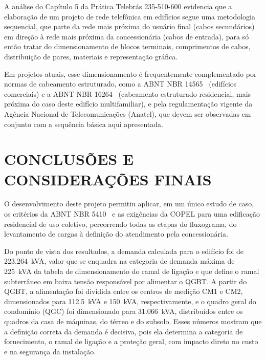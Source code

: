\documentclass[12pt,openright,oneside,a4paper,brazil]{abntex2}
\begin{document}
A análise do Capítulo 5 da Prática Telebrás 235-510-600 evidencia que a elaboração de um projeto de rede telefônica em edifícios segue uma metodologia sequencial, que parte da rede mais próxima do usuário final (cabos secundários) em direção à rede mais próxima da concessionária (cabos de entrada), para só então tratar do dimensionamento de blocos terminais, comprimentos de cabos, distribuição de pares, materiais e representação gráfica.

Em projetos atuais, esse dimensionamento é frequentemente complementado por normas de cabeamento estruturado, como a ABNT NBR 14565~\cite{nbr14565} (edifícios comerciais) e a ABNT NBR 16264~\cite{nbr16264} (cabeamento estruturado residencial, mais próxima do caso deste edifício multifamiliar), e pela regulamentação vigente da Agência Nacional de Telecomunicações (Anatel), que devem ser observadas em conjunto com a sequência básica aqui apresentada.

\chapter{CONCLUSÕES E CONSIDERAÇÕES FINAIS}

\hspace{1.27cm}O desenvolvimento deste projeto permitiu aplicar, em um único estudo de caso, os critérios da ABNT NBR 5410~\cite{nbr5410} e as exigências da COPEL para uma edificação residencial de uso coletivo, percorrendo todas as etapas do fluxograma, do levantamento de cargas à definição do atendimento pela concessionária.

Do ponto de vista dos resultados, a demanda calculada para o edifício foi de \SI{223,264}{kVA}, valor que se enquadra na categoria de demanda máxima de \SI{225}{kVA} da tabela de dimensionamento do ramal de ligação e que define o ramal subterrâneo em baixa tensão responsável por alimentar o QGBT. A partir do QGBT, a alimentação foi dividida entre os centros de medição CM1 e CM2, dimensionados para \SI{112,5}{kVA} e \SI{150}{kVA}, respectivamente, e o quadro geral do condomínio (QGC) foi dimensionado para \SI{31,066}{kVA}, distribuídos entre os quadros da casa de máquinas, do térreo e do subsolo. Esses números mostram que a definição correta da demanda é decisiva, pois ela determina a categoria de fornecimento, o ramal de ligação e a proteção geral, com impacto direto no custo e na segurança da instalação.
\end{document}
